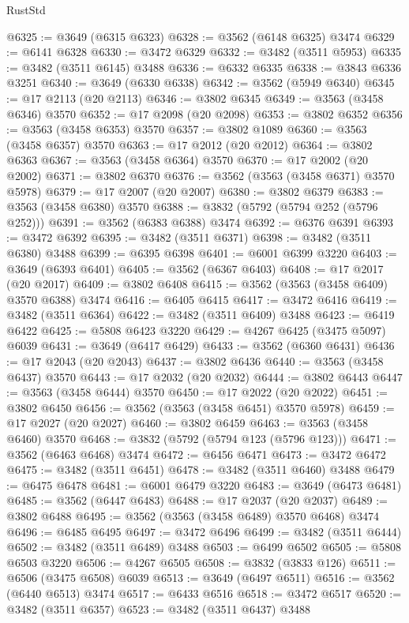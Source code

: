 \begin{lexlean}{RustStd}
\begin{coremodule}
@6325 := @3649 (@6315 @6323)
@6328 := @3562 (@6148 @6325) @3474
@6329 := @6141 @6328
@6330 := @3472 @6329
@6332 := @3482 (@3511 @5953)
@6335 := @3482 (@3511 @6145) @3488
@6336 := @6332 @6335
@6338 := @3843 @6336 @3251
@6340 := @3649 (@6330 @6338)
@6342 := @3562 (@5949 @6340)
@6345 := @17 @2113 (@20 @2113)
@6346 := @3802 @6345
@6349 := @3563 (@3458 @6346) @3570
@6352 := @17 @2098 (@20 @2098)
@6353 := @3802 @6352
@6356 := @3563 (@3458 @6353) @3570
@6357 := @3802 @1089
@6360 := @3563 (@3458 @6357) @3570
@6363 := @17 @2012 (@20 @2012)
@6364 := @3802 @6363
@6367 := @3563 (@3458 @6364) @3570
@6370 := @17 @2002 (@20 @2002)
@6371 := @3802 @6370
@6376 := @3562 (@3563 (@3458 @6371) @3570 @5978)
@6379 := @17 @2007 (@20 @2007)
@6380 := @3802 @6379
@6383 := @3563 (@3458 @6380) @3570
@6388 := @3832 (@5792 (@5794 @252 (@5796 @252)))
@6391 := @3562 (@6383 @6388) @3474
@6392 := @6376 @6391
@6393 := @3472 @6392
@6395 := @3482 (@3511 @6371)
@6398 := @3482 (@3511 @6380) @3488
@6399 := @6395 @6398
@6401 := @6001 @6399 @3220
@6403 := @3649 (@6393 @6401)
@6405 := @3562 (@6367 @6403)
@6408 := @17 @2017 (@20 @2017)
@6409 := @3802 @6408
@6415 := @3562 (@3563 (@3458 @6409) @3570 @6388) @3474
@6416 := @6405 @6415
@6417 := @3472 @6416
@6419 := @3482 (@3511 @6364)
@6422 := @3482 (@3511 @6409) @3488
@6423 := @6419 @6422
@6425 := @5808 @6423 @3220
@6429 := @4267 @6425 (@3475 @5097) @6039
@6431 := @3649 (@6417 @6429)
@6433 := @3562 (@6360 @6431)
@6436 := @17 @2043 (@20 @2043)
@6437 := @3802 @6436
@6440 := @3563 (@3458 @6437) @3570
@6443 := @17 @2032 (@20 @2032)
@6444 := @3802 @6443
@6447 := @3563 (@3458 @6444) @3570
@6450 := @17 @2022 (@20 @2022)
@6451 := @3802 @6450
@6456 := @3562 (@3563 (@3458 @6451) @3570 @5978)
@6459 := @17 @2027 (@20 @2027)
@6460 := @3802 @6459
@6463 := @3563 (@3458 @6460) @3570
@6468 := @3832 (@5792 (@5794 @123 (@5796 @123)))
@6471 := @3562 (@6463 @6468) @3474
@6472 := @6456 @6471
@6473 := @3472 @6472
@6475 := @3482 (@3511 @6451)
@6478 := @3482 (@3511 @6460) @3488
@6479 := @6475 @6478
@6481 := @6001 @6479 @3220
@6483 := @3649 (@6473 @6481)
@6485 := @3562 (@6447 @6483)
@6488 := @17 @2037 (@20 @2037)
@6489 := @3802 @6488
@6495 := @3562 (@3563 (@3458 @6489) @3570 @6468) @3474
@6496 := @6485 @6495
@6497 := @3472 @6496
@6499 := @3482 (@3511 @6444)
@6502 := @3482 (@3511 @6489) @3488
@6503 := @6499 @6502
@6505 := @5808 @6503 @3220
@6506 := @4267 @6505
@6508 := @3832 (@3833 @126)
@6511 := @6506 (@3475 @6508) @6039
@6513 := @3649 (@6497 @6511)
@6516 := @3562 (@6440 @6513) @3474
@6517 := @6433 @6516
@6518 := @3472 @6517
@6520 := @3482 (@3511 @6357)
@6523 := @3482 (@3511 @6437) @3488

\end{coremodule}
\end{lexlean}
